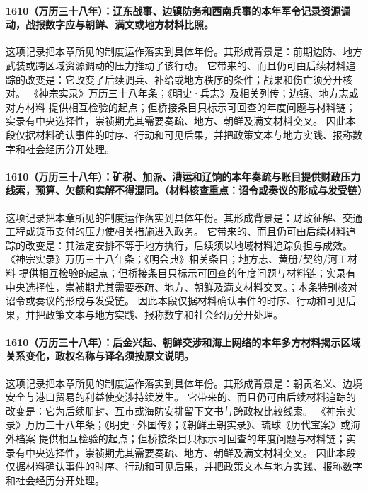 \paragraph{1610（万历三十八年）：辽东战事、边镇防务和西南兵事的本年军令记录资源调动，战报数字应与朝鲜、满文或地方材料比照。} 这项记录把本章所见的制度运作落实到具体年份。其形成背景是：前期边防、地方武装或跨区域资源调动的压力推动了该行动。 它带来的、而且仍可由后续材料追踪的改变是：它改变了后续调兵、补给或地方秩序的条件；战果和伤亡须分开核对。 《神宗实录》万历三十八年条；《明史·兵志》及相关列传；边镇、地方志或对方材料 提供相互检验的起点；但桥接条目只标示可回查的年度问题与材料链；实录有中央选择性，崇祯期尤其需要奏疏、地方、朝鲜及满文材料交叉。 因此本段仅据材料确认事件的时序、行动和可见后果，并把政策文本与地方实践、报称数字和社会经历分开处理。

\paragraph{1610（万历三十八年）：矿税、加派、漕运和辽饷的本年奏疏与账目提供财政压力线索，预算、欠额和实解不得混同。（材料核查重点：诏令或奏议的形成与发受链）} 这项记录把本章所见的制度运作落实到具体年份。其形成背景是：财政征解、交通工程或货币支付的压力使相关措施进入政务。 它带来的、而且仍可由后续材料追踪的改变是：其法定安排不等于地方执行，后续须以地域材料追踪负担与成效。 《神宗实录》万历三十八年条；《明会典》相关条目；地方志、黄册/契约/河工材料 提供相互检验的起点；但桥接条目只标示可回查的年度问题与材料链；实录有中央选择性，崇祯期尤其需要奏疏、地方、朝鲜及满文材料交叉。；本条特别核对诏令或奏议的形成与发受链。 因此本段仅据材料确认事件的时序、行动和可见后果，并把政策文本与地方实践、报称数字和社会经历分开处理。

\paragraph{1610（万历三十八年）：后金兴起、朝鲜交涉和海上网络的本年多方材料揭示区域关系变化，政权名称与译名须按原文说明。} 这项记录把本章所见的制度运作落实到具体年份。其形成背景是：朝贡名义、边境安全与港口贸易的利益使交涉持续发生。 它带来的、而且仍可由后续材料追踪的改变是：它为后续册封、互市或海防安排留下文书与跨政权比较线索。 《神宗实录》万历三十八年条；《明史·外国传》；《朝鲜王朝实录》、琉球《历代宝案》或海外档案 提供相互检验的起点；但桥接条目只标示可回查的年度问题与材料链；实录有中央选择性，崇祯期尤其需要奏疏、地方、朝鲜及满文材料交叉。 因此本段仅据材料确认事件的时序、行动和可见后果，并把政策文本与地方实践、报称数字和社会经历分开处理。


